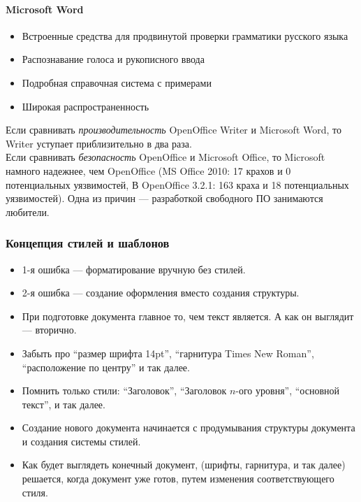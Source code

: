 \paragraph{Microsoft Word}\label{par:ms-word}
\begin{itemize}
    \item Встроенные средства для продвинутой проверки грамматики русского языка
    \item Распознавание голоса и рукописного ввода
    \item Подробная справочная система с примерами
    \item Широкая распространенность
\end{itemize}

Если сравнивать \emph{производительность} OpenOffice Writer и Microsoft Word, то Writer уступает приблизительно в два раза. \\
Если сравнивать \emph{безопасность} OpenOffice и Microsoft Office, то Microsoft намного надежнее, чем OpenOffice (MS Office 2010: 17 крахов и 0 потенциальных уязвимостей, В OpenOffice 3.2.1: 163 краха и 18 потенциальных уязвимостей). Одна из причин --- разработкой свободного ПО занимаются любители.

\subsubsection{Концепция стилей и шаблонов}\label{subsubsec:template-concept}

\begin{itemize}
    \item 1-я ошибка --- форматирование вручную без стилей.
    \item 2-я ошибка --- создание оформления вместо создания структуры.
    \item При подготовке документа главное то, чем текст является. А как он выглядит --- вторично.
    \item Забыть про \enquote{размер шрифта 14pt}, \enquote{гарнитура Times New Roman}, \enquote{расположение по центру} и так далее.
    \item Помнить только стили: \enquote{Заголовок}, \enquote{Заголовок $n$-ого уровня}, \enquote{основной текст}, и так далее.
    \item Создание нового документа начинается с продумывания структуры документа и создания системы стилей.
    \item Как будет выглядеть конечный документ, (шрифты, гарнитура, и так далее) решается, когда документ уже готов, путем изменения соответствующего стиля.
\end{itemize}

